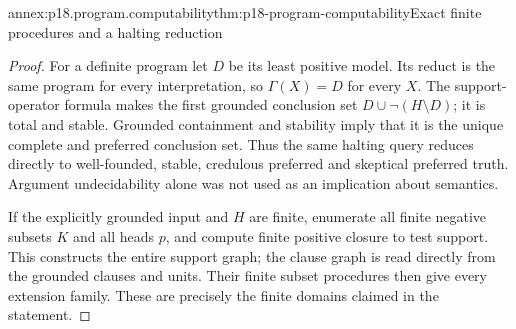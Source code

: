 \begin{annexitem}{annex:p18.program.computability}{thm:p18-program-computability}{Exact finite procedures and a halting reduction}
\begin{proof}
For a definite program let \(D\)
be its least positive model.
Its reduct is the same program
for every interpretation, so
\(\Gamma(X)=D\) for every \(X\).
The support-operator formula makes
the first grounded conclusion set
\(D\cup\neg(H\setminus D)\);
it is total and stable. Grounded
containment and stability imply
that it is the unique complete
and preferred conclusion set.
Thus the same halting query reduces
directly to well-founded, stable,
credulous preferred and skeptical
preferred truth. Argument
undecidability alone was not used
as an implication about semantics.

If the explicitly grounded input
and \(H\) are finite, enumerate
all finite negative subsets \(K\)
and all heads \(p\), and compute
finite positive closure to test
support. This constructs the
entire support graph; the clause
graph is read directly from the
grounded clauses and units.
Their finite subset procedures
then give every extension family.
These are precisely the finite
domains claimed in the statement.
\end{proof}
\end{annexitem}

